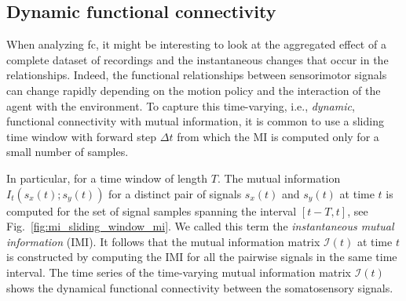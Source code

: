 \subsection{Dynamic functional connectivity}
When analyzing \ac{fc}, it might be interesting to look at the aggregated effect of a complete dataset of recordings and the instantaneous changes that occur in the relationships. Indeed, the functional relationships between sensorimotor signals can change rapidly depending on the motion policy and the interaction of the agent with the environment. To capture this time-varying, i.e., \emph{dynamic}, functional connectivity with mutual information, it is common to use a sliding time window \cite{Preti2017dynamicfunctionalconnectome} with forward step $\Delta t$ from which the MI is computed only for a small number of samples.

In particular, for a time window of length $T$. The mutual information $I_t(s_x(t);s_y(t))$ for a distinct pair of signals $s_x(t)$ and $s_y(t)$ at time $t$ is computed for the set of signal samples spanning the interval $\left[t-T,t\right]$, see Fig.~\ref{fig:mi_sliding_window_mi}. We called this term the \emph{instantaneous mutual information} (IMI). It follows that the mutual information matrix $\bm{\mathcal{I}}(t)$ at time $t$ is constructed by computing the IMI for all the pairwise signals in the same time interval. The time series of the time-varying mutual information matrix $\bm{\mathcal{I}}(t)$ shows the dynamical functional connectivity between the somatosensory signals.


